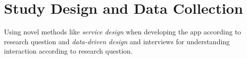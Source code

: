\section{Study Design and Data Collection}

Using novel methods like \textit{service design} when developing the app according to research question and \textit{data-driven design} and interviews for understanding interaction according to research question.










